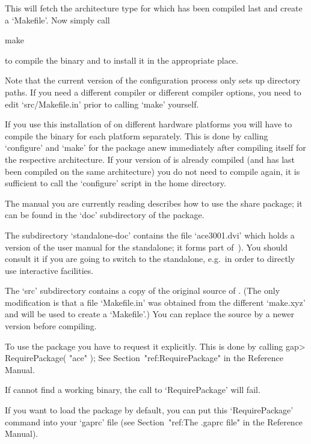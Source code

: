 This  will fetch  the  architecture  type for  which  {\GAP} has  been
compiled last and create a `Makefile'. Now simply call

\begintt
make
\endtt

to compile the binary and to install it in the appropriate place.

Note that the  current version of the configuration  process only sets
up  directory paths.  If you  need a  different compiler  or different
compiler options, you need  to edit `src/Makefile.in' prior to calling
`make' yourself.

If you use this installation of {\GAP} on different hardware platforms
you will have to compile the binary for each platform separately. This
is  done  by calling  `configure'  and  `make'  for the  package  anew
immediately   after  compiling  {\GAP}   itself  for   the  respective
architecture.  If your version of  {\GAP} is already compiled (and has
last  been compiled  on  the same  architecture)  you do  not need  to
compile {\GAP} again, it is  sufficient to call the `configure' script
in the {\GAP} home directory.

The manual you are currently reading describes how to use the   {\ACE}
share package; it can be found in the `doc' subdirectory of the package.

The  subdirectory  `standalone-doc'  contains the  file  `ace3001.dvi'
which holds a version of the user manual for the {\ACE} standalone; it
forms part of~\cite{Ram99a}).  You should consult it if  you are going
to  switch to  the {\ACE}  standalone, e.g.~in  order to  directly use
interactive facilities.

The  `src' subdirectory  contains a  copy  of the  original source  of
{\ACE}.  (The  only modification  is  that  a  file `Makefile.in'  was
obtained from  the different `make.xyz' and  will be used  to create a
`Makefile'.)  You  can replace  the source by  a newer  version before
compiling.


To use  the {\ACE} package you  have to request it  explicitly. This is
done by calling
\begintt
gap> RequirePackage( "ace" );
\endtt
See Section~"ref:RequirePackage" in the {\GAP} Reference Manual.

If {\GAP} cannot find a working binary, the call to `RequirePackage' will
fail.

If you want to load the {\ACE} package by default, you can put this
`RequirePackage' command into your `gaprc' file
(see Section~"ref:The .gaprc file" in the {\GAP} Reference Manual).


